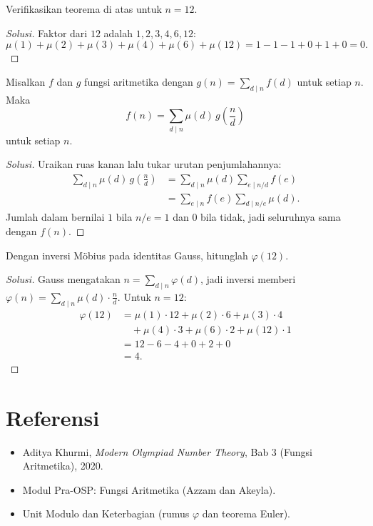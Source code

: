 \documentclass[12pt]{scrartcl}
\begin{document}
\begin{example}
Verifikasikan teorema di atas untuk $n = 12$.
\end{example}
\begin{proof}[Solusi]
Faktor dari $12$ adalah $1, 2, 3, 4, 6, 12$:
\[ \mu(1) + \mu(2) + \mu(3) + \mu(4) + \mu(6) + \mu(12)
= 1 - 1 - 1 + 0 + 1 + 0 = 0. \]
\end{proof}

\begin{theorem}
Misalkan $f$ dan $g$ fungsi aritmetika dengan $g(n) = \sum_{d \mid n} f(d)$
untuk setiap $n$. Maka
\[ f(n) = \sum_{d \mid n} \mu(d)\, g\left(\frac{n}{d}\right) \]
untuk setiap $n$.
\end{theorem}

\begin{proof}[Solusi]
Uraikan ruas kanan lalu tukar urutan penjumlahannya:
\begin{align*}
\sum_{d \mid n} \mu(d)\, g\left(\frac{n}{d}\right)
&= \sum_{d \mid n} \mu(d) \sum_{e \mid n/d} f(e) \\
&= \sum_{e \mid n} f(e) \sum_{d \mid n/e} \mu(d).
\end{align*}
Jumlah dalam bernilai $1$ bila $n/e = 1$ dan $0$ bila tidak,
jadi seluruhnya sama dengan $f(n)$.
\end{proof}

\begin{example}
Dengan inversi M\"obius pada identitas Gauss, hitunglah $\varphi(12)$.
\end{example}
\begin{proof}[Solusi]
Gauss mengatakan $n = \sum_{d \mid n} \varphi(d)$,
jadi inversi memberi $\varphi(n) = \sum_{d \mid n} \mu(d) \cdot \frac{n}{d}$.
Untuk $n = 12$:
\begin{align*}
\varphi(12) &= \mu(1) \cdot 12 + \mu(2) \cdot 6 + \mu(3) \cdot 4 \\
&\quad + \mu(4) \cdot 3 + \mu(6) \cdot 2 + \mu(12) \cdot 1 \\
&= 12 - 6 - 4 + 0 + 2 + 0 \\
&= 4.
\end{align*}
\end{proof}

\section{Referensi}
\begin{itemize}
    \item Aditya Khurmi, \textit{Modern Olympiad Number Theory},
    Bab 3 (Fungsi Aritmetika), 2020.
    \item Modul Pra-OSP: Fungsi Aritmetika (Azzam dan Akeyla).
    \item Unit Modulo dan Keterbagian (rumus $\varphi$ dan teorema Euler).
\end{itemize}
\end{document}
